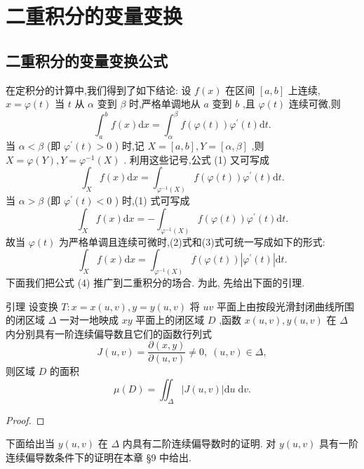 \section{二重积分的变量变换}

\subsection{二重积分的变量变换公式}

在定积分的计算中,我们得到了如下结论: 设 \(f\left( x\right)\) 在区间 \(\left\lbrack  {a,b}\right\rbrack\) 上连续, \(x = \varphi \left( t\right)\) 当 \(t\) 从 \(\alpha\) 变到 \(\beta\) 时,严格单调地从 \(a\) 变到 \(b\) ,且 \(\varphi \left( t\right)\) 连续可微,则
\[
{\int }_{a}^{b}f\left( x\right) \mathrm{d}x = {\int }_{\alpha }^{\beta }f\left( {\varphi \left( t\right) }\right) {\varphi }^{\prime }\left( t\right) \mathrm{d}t. \tag{1}
\]
当 \(\alpha  < \beta\) (即 \({\varphi }^{\prime }\left( t\right)  > 0\) ) 时,记 \(X = \left\lbrack  {a,b}\right\rbrack  ,Y = \left\lbrack  {\alpha ,\beta }\right\rbrack\) ,则 \(X = \varphi \left( Y\right) ,Y = {\varphi }^{-1}\left( X\right)\) . 利用这些记号,公式 (1) 又可写成
\[
{\int }_{X}f\left( x\right) \mathrm{d}x = {\int }_{{\varphi }^{-1}\left( X\right) }f\left( {\varphi \left( t\right) }\right) {\varphi }^{\prime }\left( t\right) \mathrm{d}t. \tag{2}
\]
当 \(\alpha  > \beta\) (即 \({\varphi }^{\prime }\left( t\right)  < 0\) ) 时,(1) 式可写成
\[
{\int }_{X}f\left( x\right) \mathrm{d}x =  - {\int }_{{\varphi }^{-1}\left( X\right) }f\left( {\varphi \left( t\right) }\right) {\varphi }^{\prime }\left( t\right) \mathrm{d}t. \tag{3}
\]
故当 \(\varphi \left( t\right)\) 为严格单调且连续可微时,(2)式和(3)式可统一写成如下的形式:
\[
{\int }_{X}f\left( x\right) \mathrm{d}x = {\int }_{{\varphi }^{-1}\left( X\right) }f\left( {\varphi \left( t\right) }\right) \left| {{\varphi }^{\prime }\left( t\right) }\right| \mathrm{d}t. \tag{4}
\]
下面我们把公式 (4) 推广到二重积分的场合. 为此, 先给出下面的引理.

引理 设变换 \(T : x = x\left( {u,v}\right) ,y = y\left( {u,v}\right)\) 将 \({uv}\) 平面上由按段光滑封闭曲线所围的闭区域 \(\Delta\) 一对一地映成 \({xy}\) 平面上的闭区域 \(D\) ,函数 \(x\left( {u,v}\right) ,y\left( {u,v}\right)\) 在 \(\Delta\) 内分别具有一阶连续偏导数且它们的函数行列式
\[
J\left( {u,v}\right)  = \frac{\partial \left( {x,y}\right) }{\partial \left( {u,v}\right) } \neq  0,\;\left( {u,v}\right)  \in  \Delta ,
\]
则区域 \(D\) 的面积
\[
\mu \left( D\right)  = {\iint }_{\Delta }\left| {J\left( {u,v}\right) }\right| \mathrm{d}u\mathrm{\;d}v. \tag{5}
\]
\begin{proof}

\end{proof}
下面给出当 \(y\left( {u,v}\right)\) 在 \(\Delta\) 内具有二阶连续偏导数时的证明. 对 \(y\left( {u,v}\right)\) 具有一阶连续偏导数条件下的证明在本章 §9 中给出.


